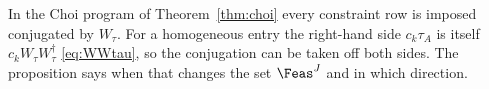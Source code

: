 
In the Choi program of Theorem~\ref{thm:choi} every constraint row is
imposed conjugated by $W_{\tau}$. For a homogeneous entry the right-hand
side $c_k\tau_A$ is itself $c_kW_{\tau}W_{\tau}^{\dagger}$
\eqref{eq:WWtau}, so the conjugation can be taken off both sides. The
proposition says when that changes the set $\Feas^{J}$ and in which
direction.

